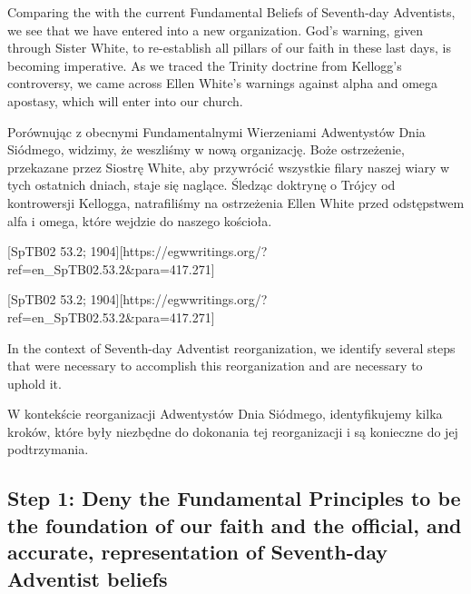 Comparing the  with the current Fundamental Beliefs of Seventh-day Adventists, we see that we have entered into a new organization. God’s warning, given through Sister White, to re-establish all pillars of our faith in these last days, is becoming imperative. As we traced the Trinity doctrine from Kellogg's controversy, we came across Ellen White’s warnings against alpha and omega apostasy, which will enter into our church.


Porównując  z obecnymi Fundamentalnymi Wierzeniami Adwentystów Dnia Siódmego, widzimy, że weszliśmy w nową organizację. Boże ostrzeżenie, przekazane przez Siostrę White, aby przywrócić wszystkie filary naszej wiary w tych ostatnich dniach, staje się naglące. Śledząc doktrynę o Trójcy od kontrowersji Kellogga, natrafiliśmy na ostrzeżenia Ellen White przed odstępstwem alfa i omega, które wejdzie do naszego kościoła.


[SpTB02 53.2; 1904][https://egwwritings.org/?ref=en\_SpTB02.53.2&para=417.271]


[SpTB02 53.2; 1904][https://egwwritings.org/?ref=en\_SpTB02.53.2&para=417.271]


In the context of Seventh-day Adventist reorganization, we identify several steps that were necessary to accomplish this reorganization and are necessary to uphold it.


W kontekście reorganizacji Adwentystów Dnia Siódmego, identyfikujemy kilka kroków, które były niezbędne do dokonania tej reorganizacji i są konieczne do jej podtrzymania.


\subsection*{Step 1: Deny the Fundamental Principles to be the foundation of our faith and the official, and accurate, representation of Seventh-day Adventist beliefs}


